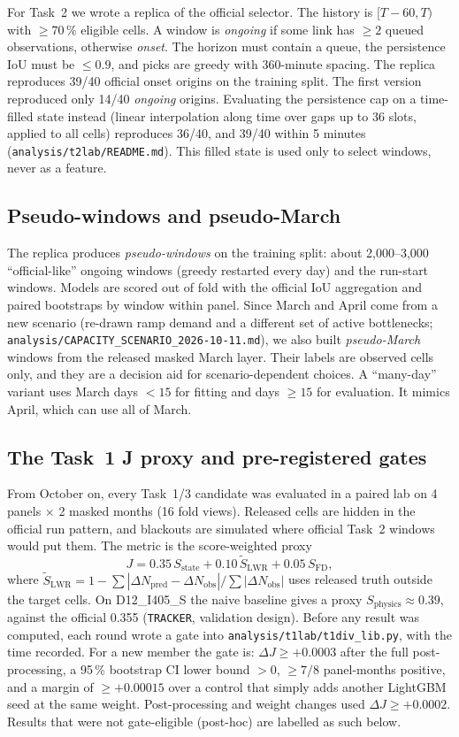 \documentclass[conference,10pt]{IEEEtran}
\newcommand{\file}[1]{\texttt{\small #1}}
\newcommand{\dJ}{\Delta J}
\begin{document}
For Task~2 we wrote a replica of the official selector. The history is $[T{-}60,T)$ with $\ge70\,\%$ eligible cells. A window is
\emph{ongoing} if some link has $\ge2$ queued observations, otherwise \emph{onset}. The horizon must contain a queue,
the persistence IoU must be $\le0.9$, and picks are greedy with 360-minute spacing. The replica reproduces 39/40 official onset origins
on the training split. The first version reproduced only 14/40 \emph{ongoing} origins. Evaluating the persistence cap on a time-filled
state instead (linear interpolation along time over gaps up to 36 slots, applied to all cells) reproduces 36/40, and 39/40 within
5 minutes (\file{analysis/t2lab/README.md}). This filled state is used only to select windows, never as a feature.

\subsection{Pseudo-windows and pseudo-March}
The replica produces \emph{pseudo-windows} on the training split: about 2{,}000--3{,}000 ``official-like'' ongoing windows (greedy
restarted every day) and the run-start windows. Models are scored out of fold with the official IoU aggregation and paired
bootstraps by window within panel. Since March and April come from a new scenario (re-drawn ramp demand and a different set of
active bottlenecks; \file{analysis/CAPACITY\_SCENARIO\_2026-10-11.md}), we also built \emph{pseudo-March} windows from the released
masked March layer. Their labels are observed cells only, and they are a decision aid for scenario-dependent choices. A
``many-day'' variant uses March days $<15$ for fitting and days $\ge15$ for evaluation. It mimics April, which can use all
of March.

\subsection{The Task~1 J proxy and pre-registered gates}
From October on, every Task~1/3 candidate was evaluated in a paired lab on 4 panels $\times$ 2 masked months (16
fold views). Released cells are hidden in the official run pattern, and blackouts are simulated where official Task~2 windows
would put them. The metric is the score-weighted proxy
\begin{equation}
J = 0.35\,S_\text{state} + 0.10\,\widetilde S_\text{LWR} + 0.05\,S_\text{FD},
\end{equation}
where $\widetilde S_\text{LWR}=1-\sum|\Delta N_\text{pred}-\Delta N_\text{obs}|/\sum|\Delta N_\text{obs}|$ uses released
truth outside the target cells. On D12\_I405\_S the naive baseline gives a proxy $S_\text{physics}\approx0.39$, against the official 0.355
(\file{TRACKER}, validation design). Before any result was computed, each round wrote a gate into
\file{analysis/t1lab/t1div\_lib.py}, with the time recorded. For a new member the gate is: $\dJ\ge+0.0003$ after the
full post-processing, a 95\,\% bootstrap CI lower bound $>0$, $\ge7/8$ panel-months positive, and a margin of $\ge+0.00015$ over a
control that simply adds another LightGBM seed at the same weight. Post-processing and weight changes used
$\dJ\ge+0.0002$. Results that were not gate-eligible (post-hoc) are labelled as such below.
\end{document}

